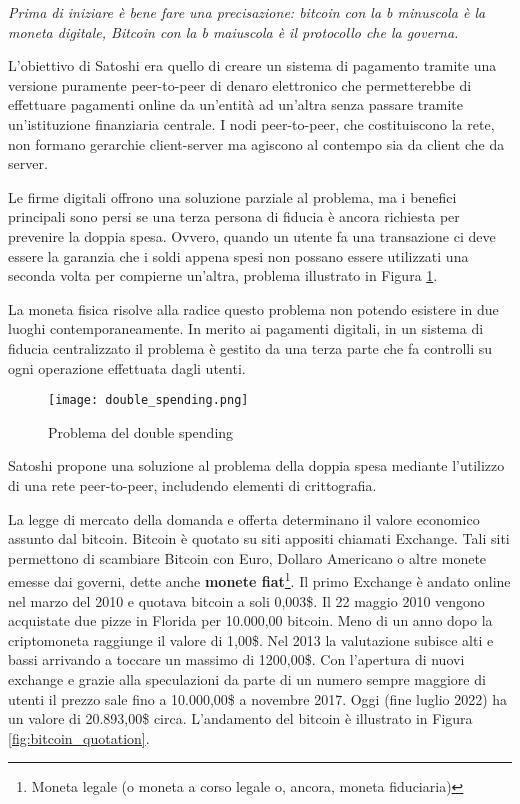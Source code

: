 \textit{Prima di iniziare è bene fare una precisazione: bitcoin con la b minuscola è la moneta digitale, Bitcoin con la b maiuscola è il protocollo che la governa.}

L'obiettivo di Satoshi era quello di creare un sistema di pagamento tramite una versione puramente peer-to-peer di denaro elettronico che permetterebbe di effettuare pagamenti online da un'entità ad un'altra senza passare tramite un'istituzione finanziaria centrale. I nodi peer-to-peer, che costituiscono la rete, non formano gerarchie client-server ma agiscono al contempo sia da client che da server.

Le firme digitali offrono una soluzione parziale al problema, ma i benefici principali sono persi se una terza persona di fiducia è ancora richiesta per prevenire la doppia spesa. Ovvero, quando un utente fa una transazione ci deve essere la garanzia che i soldi appena spesi non possano essere utilizzati una seconda volta per compierne un'altra, problema illustrato in Figura \ref{fig:double_spending}.

La moneta fisica risolve alla radice questo problema non potendo esistere in due luoghi contemporaneamente. In merito ai pagamenti digitali, in un sistema di fiducia centralizzato il problema è gestito da una terza parte che fa controlli su ogni operazione effettuata dagli utenti.

\begin{figure}[htbp]
  \centering
  \texttt{[image: double\_spending.png]}
  \caption{Problema del double spending}
  \label{fig:double_spending}
\end{figure}

Satoshi propone una soluzione al problema della doppia spesa mediante l'utilizzo di una rete peer-to-peer, includendo elementi di crittografia.

La legge di mercato della domanda e offerta determinano il valore economico assunto dal bitcoin. Bitcoin è quotato su siti appositi chiamati Exchange. Tali siti permettono di scambiare Bitcoin con Euro, Dollaro Americano o altre monete emesse dai governi, dette anche \textbf{monete fiat}\footnote{Moneta legale (o moneta a corso legale o, ancora, moneta fiduciaria)}. Il primo Exchange è andato online nel marzo del 2010 e quotava bitcoin a soli 0,003\$. Il 22 maggio 2010 vengono acquistate due pizze in Florida per 10.000,00 bitcoin. Meno di un anno dopo la criptomoneta raggiunge il valore di 1,00\$. Nel 2013 la valutazione subisce alti e bassi arrivando a toccare un massimo di 1200,00\$. Con l'apertura di nuovi exchange e grazie alla speculazioni da parte di un numero sempre maggiore di utenti il prezzo sale fino a 10.000,00\$ a novembre 2017. Oggi (fine luglio 2022) ha un valore di 20.893,00\$ circa. L'andamento del bitcoin è illustrato in Figura \ref{fig:bitcoin_quotation}.

